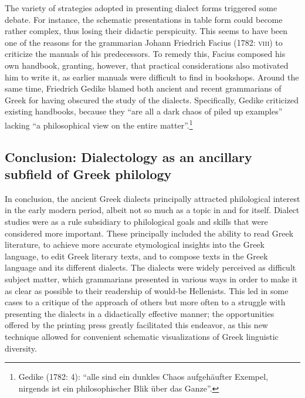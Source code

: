 \begin{styleStandard}
The variety of strategies adopted in presenting dialect forms triggered some debate. For instance, the schematic presentations in table form could become rather complex, thus losing their didactic perspicuity. This seems to have been one of the reasons for the grammarian Johann Friedrich Facius (1782: \textsc{viii}) to criticize the manuals of his predecessors. To remedy this, Facius composed his own handbook, granting, however, that practical considerations also motivated him to write it, as earlier manuals were difficult to find in bookshops. Around the same time, Friedrich Gedike blamed both ancient and recent grammarians of Greek for having obscured the study of the dialects. Specifically, Gedike criticized existing handbooks, because they “are all a dark chaos of piled up examples” lacking “a philosophical view on the entire matter”.\footnote{ Gedike (1782: 4): “alle sind ein dunkles Chaos aufgehäufter Exempel, nirgends ist ein philosophischer Blik über das Ganze”.}
\end{styleStandard}

\subsection{Conclusion: Dialectology as an ancillary subfield of Greek philology}
\hypertarget{Toc19704825}{}\begin{styleStandard}
In conclusion, the ancient Greek dialects principally attracted philological interest in the early modern period, albeit not so much as a topic in and for itself. Dialect studies were as a rule subsidiary to philological goals and skills that were considered more important. These principally included the ability to read Greek literature, to achieve more accurate etymological insights into the Greek language, to edit Greek literary texts, and to compose texts in the Greek language and its different dialects. The dialects were widely perceived as difficult subject matter, which grammarians presented in various ways in order to make it as clear as possible to their readership of would-be Hellenists. This led in some cases to a critique of the approach of others but more often to a struggle with presenting the dialects in a didactically effective manner; the opportunities offered by the printing press greatly facilitated this endeavor, as this new technique allowed for convenient schematic visualizations of Greek linguistic diversity.
\end{styleStandard}

